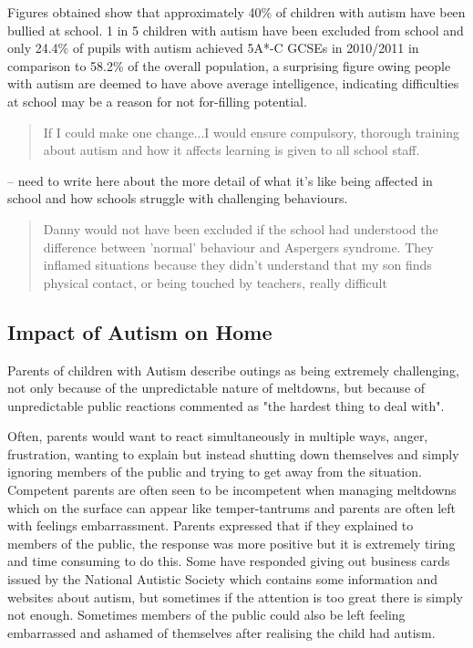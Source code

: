 \documentclass[11pt]{report}
\begin{document}
Figures obtained show that approximately 40\% of children with autism have been bullied at school. 1 in 5 children with autism have been excluded from school \cite{nasschool} and only 24.4\% of pupils with autism achieved 5A*-C GCSEs in 2010/2011 in comparison to 58.2\% of the overall population\cite{statsandfacts}, a surprising figure owing people with autism are deemed to have above average intelligence, indicating difficulties at school may be a reason for not for-filling potential. 

\begin{quote}
If I could make one change...I would ensure compulsory, thorough training about autism and how it affects learning is given to all school staff. \cite{nasschool}
\end{quote}

-- need to write here about the more detail of what it's like being affected in school and how schools struggle with challenging behaviours. 


\begin{quote}
Danny would not have been excluded if the school had understood the difference between 'normal' behaviour and Aspergers syndrome. They inflamed situations because they didn't understand that my son finds physical contact, or being touched by teachers, really difficult \cite{nasschool}
\end{quote}

\subsection{Impact of Autism on Home}
Parents of children with Autism describe outings as being extremely challenging, not only because of the unpredictable nature of meltdowns, but because of unpredictable public reactions\cite{meltdowns_goingout} commented as "the hardest thing to deal with"\cite{meltdowns_goingout}.

Often, parents would want to react simultaneously in multiple ways, anger, frustration, wanting to explain but instead shutting down themselves and simply ignoring members of the public and trying to get away from the situation\cite{meltdowns_goingout}. Competent parents are often seen to be incompetent when managing meltdowns which on the surface can appear like temper-tantrums and parents are often left with feelings embarrassment\cite{meltdowns_goingout}. Parents expressed that if they explained to members of the public, the response was more positive but it is extremely tiring and time consuming to do this\cite{meltdowns_goingout}. Some have responded giving out business cards issued by the National Autistic Society which contains some information and websites about autism, but sometimes if the attention is too great there is simply not enough. Sometimes members of the public could also be left feeling embarrassed and ashamed of themselves after realising the child had autism\cite{meltdowns_goingout}.  
\end{document}
